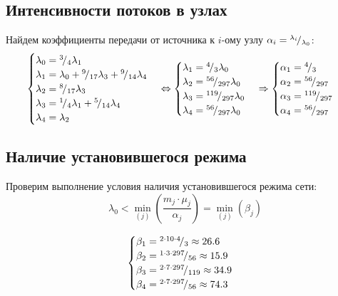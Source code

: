 \subsection{Интенсивности потоков в узлах}

Найдем коэффициенты передачи от источника к $i$-ому узлу $\alpha_i = {}^{\lambda_i}\!/_{\lambda_0}$:
\begin{displaymath}
	\begin{cases}
		\lambda_0 = \sfrac{3}{4} \lambda_1 \\
		\lambda_1 = \lambda_0 + \sfrac{9}{17} \lambda_3 + \sfrac{9}{14} \lambda_4 \\
		\lambda_2 = \sfrac{8}{17} \lambda_3 \\
		\lambda_3 = \sfrac{1}{4} \lambda_1 + \sfrac{5}{14} \lambda_4 \\
		\lambda_4 = \lambda_2
	\end{cases} \Leftrightarrow \begin{cases}
		\lambda_1 = \sfrac{4}{3} \lambda_0 \\
		\lambda_2 = \sfrac{56}{297} \lambda_0 \\
		\lambda_3 = \sfrac{119}{297} \lambda_0 \\
		\lambda_4 = \sfrac{56}{297} \lambda_0
	\end{cases} \Rightarrow \begin{cases}
		\alpha_1 = \sfrac{4}{3} \\
		\alpha_2 = \sfrac{56}{297} \\
		\alpha_3 = \sfrac{119}{297} \\
		\alpha_4 = \sfrac{56}{297}
	\end{cases}
\end{displaymath}

\subsection{Наличие установившегося режима}

Проверим выполнение условия наличия установившегося режима сети:
\begin{displaymath}
	\lambda_0 < \min \limits_{(j)} \left( \frac{m_j \cdot \mu_j}{\alpha_j} \right) = \min \limits_{(j)} \left( \beta_j \right)
\end{displaymath}

\begin{displaymath}
	\begin{cases}
		\beta_1 = {}^{2 \cdot 10 \cdot 4}\!/_{3} \approx 26.6 \\
		\beta_2 = {}^{1 \cdot 3 \cdot 297}\!/_{56} \approx 15.9 \\
		\beta_3 = {}^{2 \cdot 7 \cdot 297}\!/_{119} \approx 34.9 \\
		\beta_4 = {}^{2 \cdot 7 \cdot 297}\!/_{56} \approx 74.3
	\end{cases}	
\end{displaymath}

